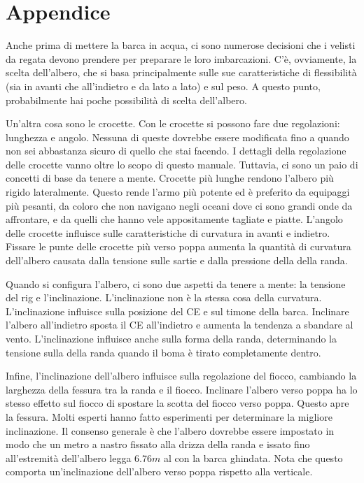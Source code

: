 
\section{Appendice}
\label{sec:appendice}
Anche prima di mettere la barca in acqua, ci sono numerose decisioni che i
velisti da regata devono prendere per preparare le loro imbarcazioni. C'è,
ovviamente, la scelta dell'albero, che si basa principalmente sulle sue
caratteristiche di flessibilità (sia in avanti che all'indietro e da lato a
lato) e sul peso. A questo punto, probabilmente hai poche possibilità di scelta
dell'albero.

Un'altra cosa sono le crocette. Con le crocette si possono fare due regolazioni:
lunghezza e angolo. Nessuna di queste dovrebbe essere modificata fino a quando
non sei abbastanza sicuro di quello che stai facendo. I dettagli della
regolazione delle crocette vanno oltre lo scopo di questo manuale. Tuttavia, ci
sono un paio di concetti di base da tenere a mente. Crocette più lunghe rendono
l'albero più rigido lateralmente. Questo rende l'armo più potente ed è
preferito da equipaggi più pesanti, da coloro che non navigano negli oceani dove
ci sono grandi onde da affrontare, e da quelli che hanno vele appositamente
tagliate e piatte. L'angolo delle crocette influisce sulle caratteristiche di
curvatura in avanti e indietro. Fissare le punte delle crocette più verso poppa
aumenta la quantità di curvatura dell'albero causata dalla tensione sulle sartie
e dalla pressione della \sheet della randa.

Quando si configura l'albero, ci sono due aspetti da tenere a mente: la tensione
del rig e l'inclinazione. L'inclinazione non è la stessa cosa della curvatura.
L'inclinazione influisce sulla posizione del \ac{CE} e sul timone della
barca. Inclinare l'albero all'indietro sposta il \ac{CE} all'indietro e aumenta la
tendenza a sbandare al vento. L'inclinazione influisce anche sulla forma della
randa, determinando la tensione sulla \sheet della randa quando il boma è tirato
completamente dentro.

Infine, l'inclinazione dell'albero influisce sulla regolazione del fiocco,
cambiando la larghezza della fessura tra la randa e il fiocco. Inclinare
l'albero verso poppa ha lo stesso effetto sul fiocco di spostare la scotta del
fiocco verso poppa. Questo apre la fessura. Molti esperti hanno fatto
esperimenti per determinare la migliore inclinazione. Il consenso generale è che
l'albero dovrebbe essere impostato in modo che un metro a nastro fissato alla
drizza della randa e issato fino all'estremità dell'albero legga $6.76\si{m}$ al
\transom con la barca ghindata.
%
Nota che questo comporta un'inclinazione dell'albero verso poppa rispetto alla
verticale.


